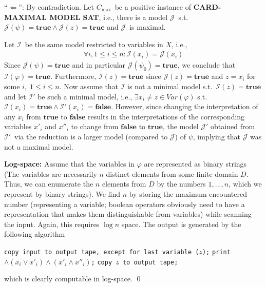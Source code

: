 \documentclass [11pt]{article}
\renewcommand{\phi}{\varphi}
\newcommand{\True}{\mathbf{true}}
\newcommand{\False}{\mathbf{false}}
\newcommand{\MAXCARDSAT}{\textbf{CARD-MAXIMAL MODEL SAT}}
\newcommand{\mI}{\ensuremath{\mathcal{I}}}
\newcommand{\mJ}{\ensuremath{\mathcal{J}}}
\newcommand{\mIp}{\ensuremath{\mathcal{I}'}}
\newcommand{\mJp}{\ensuremath{\mathcal{J}'}}
\newcommand{\fai}{\ensuremath{\forall i, 1 \leq i \leq n}}
\newcommand{\Cmax}{\ensuremath{C_\text{max}}}
\begin{document}
\medskip
``$\Leftarrow$'': By contradiction.
Let \Cmax\ be a positive instance of \MAXCARDSAT, i.e., there is a model \mJ\ s.t.\ $\mJ(\psi) = \True \land \mJ(z) = \True$ and \mJ\ is maximal.

Let \mI\ be the same model restricted to variables in $X$, i.e., 
\begin{align*}
 \fai: \mI(x_i) = \mJ(x_i)
\end{align*}
Since $\mJ(\psi) = \True$ and in particular $\mJ(\psi_0) = \True$, we conclude that $\mI(\phi) = \True$. 
Furthermore, $\mI(z) = \True$ since $\mJ(z) =\True$ and $z=x_i$ for some $i,\;1\leq i\leq  n$.
Now assume that $\mI$ is not a minimal model s.t.\ $\mI(z) = \True$ and let $\mIp$ be such a minimal model, i.e., $\exists x_i\neq z \in Var(\phi)$ s.t.\ $\mI(x_i) = \True \land \mIp(x_i) = \False$.
However, since changing the interpretation of any $x_i$ from $\True$ to $\False$ results in the interpretations of the corresponding variables $x'_i$ and $x''_i$ to change from $\False$ to $\True$,
the model $\mJp$ obtained from \mIp\ via the reduction is a larger model (compared to \mJ) of $\psi$, implying that $\mJ$ was not a maximal model.

\medskip
\noindent
\textbf{Log-space:} Assume that the variables in $\phi$ are represented as binary strings (The variables are necessarily $n$ distinct elements from some finite domain $D$. Thus, we can enumerate the $n$ elements from $D$ by the numbers $1,...,n$, which we represent by binary strings).
We find $n$ by storing the maximum encountered number (representing a variable; boolean operators obviously need to have a representation that makes them distinguishable from variables) while scanning the input. 
Again, this requires $\log n$ space. 
The output is generated by the following algorithm
\begin{algorithmic}
\State \texttt{copy input to output tape, except for last variable ($z$);}
      \State \texttt{print $\land (x_i \lor x'_i) \land (x'_i \land x''_i)$;}
\EndFor
\State \texttt{copy $z$ to output tape;}
\end{algorithmic}
which is clearly computable in log-space.
\qed
\end{document}
